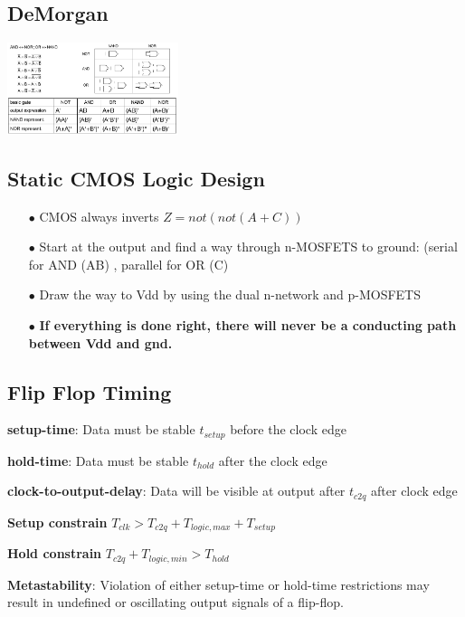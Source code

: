\documentclass[english]{latex4ei/latex4ei_sheet}
\begin{document}
\subsection{DeMorgan}
\begin{center}
	\includegraphics[width = 5cm ]{images/2. SoC Logic Design Recap/DeMorgan.png}
\end{center}
\subsection{Static CMOS Logic Design}
\begin{enumerate}
	\item[$\bullet$] CMOS always inverts $Z = not(not(A + C))$
	\item[$\bullet$] Start at the output and find a way through n-MOSFETS to ground: (serial for AND (AB) , parallel for OR (C)
	\item[$\bullet$] Draw the way to Vdd by using the dual n-network and p-MOSFETS
	\item[$\bullet$] \textbf{If everything is done right, there will
		      never be a conducting path between Vdd
		      and gnd.}
\end{enumerate}



\subsection{Flip Flop Timing}

\textbf{setup-time}: Data must be stable $t_{setup}$ before the clock edge

\textbf{hold-time}: Data must be stable $t_{hold}$ after the clock edge

\textbf{clock-to-output-delay}: Data will be visible at output after $t_{c2q}$ after clock edge

\textbf{Setup constrain} $T_{clk} > T_{c2q} + T_{logic, max} + T_{setup}$

\textbf{Hold constrain} $T_{c2q} + T_{logic, min} > T_{hold}$

\textbf{Metastability}: Violation of either setup-time or hold-time restrictions may result in undefined or oscillating output signals of a flip-flop.
\end{document}
